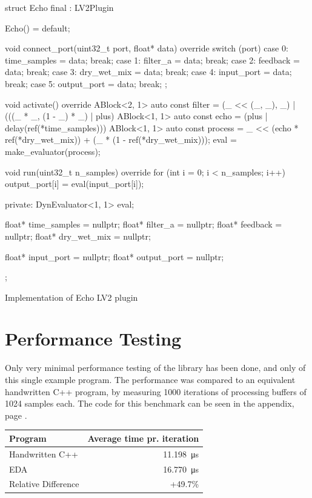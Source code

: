 \begin{listing}
  \begin{cppcodenl}
  struct Echo final : LV2Plugin {
    Echo() = default;

    void connect_port(uint32_t port, float* data) override
    {
      switch (port) {
        case 0: time_samples = data; break;
        case 1: filter_a = data; break;
        case 2: feedback = data; break;
        case 3: dry_wet_mix = data; break;
        case 4: input_port = data; break;
        case 5: output_port = data; break;
      }
    };

    void activate() override
    {
      ABlock<2, 1> auto const filter = (_ << (_, _), _) | (((_ * _, (1 - _) * _) | plus) %
      ABlock<1, 1> auto const echo = (plus | delay(ref(*time_samples))) %
      ABlock<1, 1> auto const process = _ << (echo * ref(*dry_wet_mix)) + (_ * (1 - ref(*dry_wet_mix)));
      eval = make_evaluator(process);
    }

    void run(uint32_t n_samples) override
    {
      for (int i = 0; i < n_samples; i++) {
        output_port[i] = eval(input_port[i]);
      }
    }
    
  private:
    DynEvaluator<1, 1> eval;

    float* time_samples = nullptr;
    float* filter_a = nullptr;
    float* feedback = nullptr;
    float* dry_wet_mix = nullptr;
    
    float* input_port = nullptr;
    float* output_port = nullptr;
  };
  \end{cppcodenl}
  \caption{Implementation of Echo LV2 plugin}
  \label{lst:echo_lv2}
\end{listing}

\newpage
\section{Performance Testing}

Only very minimal performance testing of the library has been done, and only of this single example program.
The performance was compared to an equivalent handwritten C++ program, by measuring 1000 iterations of
processing buffers of 1024 samples each. The code for this benchmark can be seen in the appendix, page
\pageref{codefile:tests/benchmarks.cpp}.

\begin{table}[H]
  \centering
  \begin{tabular}{|l|r|}
    \hline
    Program             & Average time pr. iteration \\
    \hline\hline
    Handwritten C++     & \SI{11.198}{\micro\second} \\
    EDA                 & \SI{16.770}{\micro\second} \\
    \hline\hline
    Relative Difference & +49.7\%                    \\
    \hline
  \end{tabular}
\end{table}

